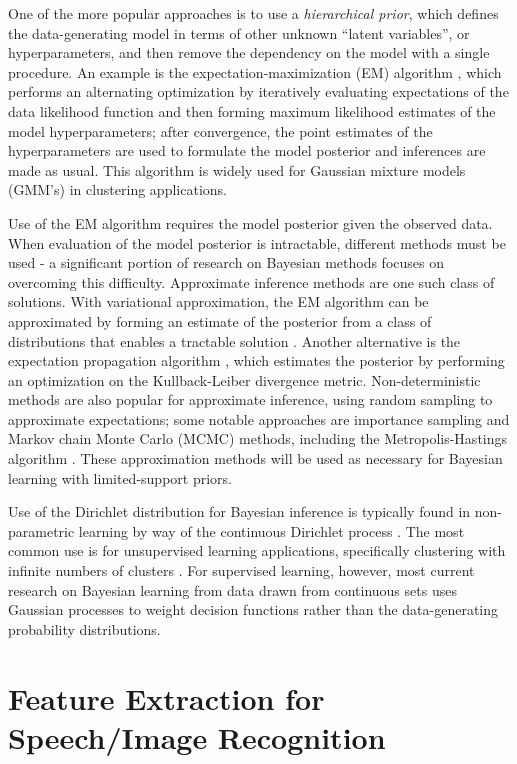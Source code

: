\documentclass[12pt]{report}
\begin{document}
One of the more popular approaches is to use a \emph{hierarchical prior}, which defines the data-generating model in terms of other unknown ``latent variables'', or hyperparameters, and then remove the dependency on the model with a single procedure. An example is the expectation-maximization (EM) algorithm \cite{dempster}, which performs an alternating optimization by iteratively evaluating expectations of the data likelihood function and then forming maximum likelihood estimates of the model hyperparameters; after convergence, the point estimates of the hyperparameters are used to formulate the model posterior and inferences are made as usual. This algorithm is widely used for Gaussian mixture models (GMM's) in clustering applications.

Use of the EM algorithm requires the model posterior given the observed data. When evaluation of the model posterior is intractable, different methods must be used - a significant portion of research on Bayesian methods focuses on overcoming this difficulty. Approximate inference methods are one such class of solutions. With variational approximation, the EM algorithm can be approximated by forming an estimate of the posterior from a class of distributions that enables a tractable solution \cite{beal}. Another alternative is the expectation propagation algorithm \cite{minka-ep}, which estimates the posterior by performing an optimization on the Kullback-Leiber divergence metric. Non-deterministic methods are also popular for approximate inference, using random sampling to approximate expectations; some notable approaches are importance sampling \cite{mackay-is} and Markov chain Monte Carlo (MCMC) methods, including the Metropolis-Hastings algorithm \cite{hastings}. These approximation methods will be used as necessary for Bayesian learning with limited-support priors.


Use of the Dirichlet distribution for Bayesian inference is typically found in non-parametric learning by way of the continuous Dirichlet process \cite{ferguson}. The most common use is for unsupervised learning applications, specifically clustering with infinite numbers of clusters \cite{gershman}. For supervised learning, however, most current research on Bayesian learning from data drawn from continuous sets uses Gaussian processes \cite{rasmussen,meeds} to weight decision functions rather than the data-generating probability distributions.



\section{Feature Extraction for Speech/Image Recognition}
\end{document}
